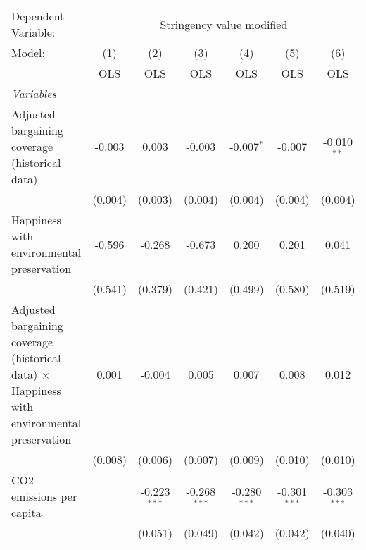 
\begingroup
\centering
\begin{tabular}{lcccccc}
   \toprule
   Dependent Variable: & \multicolumn{6}{c}{Stringency value modified}\\
   Model:                                                                                             & (1)     & (2)            & (3)            & (4)            & (5)            & (6)\\  
                                                                                                      &  OLS    & OLS            & OLS            & OLS            & OLS            & OLS\\  
   \midrule
   \emph{Variables}\\
   Adjusted bargaining coverage (historical data)                                                     & -0.003  & 0.003          & -0.003         & -0.007$^{*}$   & -0.007         & -0.010$^{**}$\\   
                                                                                                      & (0.004) & (0.003)        & (0.004)        & (0.004)        & (0.004)        & (0.004)\\   
   Happiness with environmental preservation                                                          & -0.596  & -0.268         & -0.673         & 0.200          & 0.201          & 0.041\\   
                                                                                                      & (0.541) & (0.379)        & (0.421)        & (0.499)        & (0.580)        & (0.519)\\   
   Adjusted bargaining coverage (historical data) $\times$ Happiness with environmental preservation  & 0.001   & -0.004         & 0.005          & 0.007          & 0.008          & 0.012\\   
                                                                                                      & (0.008) & (0.006)        & (0.007)        & (0.009)        & (0.010)        & (0.010)\\   
   CO2 emissions per capita                                                                           &         & -0.223$^{***}$ & -0.268$^{***}$ & -0.280$^{***}$ & -0.301$^{***}$ & -0.303$^{***}$\\   
                                                                                                      &         & (0.051)        & (0.049)        & (0.042)        & (0.042)        & (0.040)\\   

\end{tabular}

